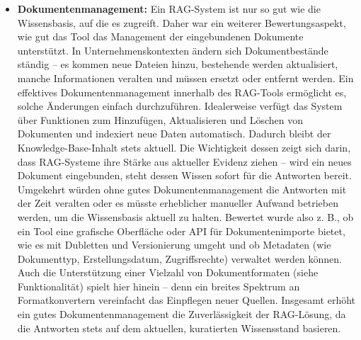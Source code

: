 \begin{itemize}
    \item \textbf{Dokumentenmanagement:} Ein RAG-System ist nur so gut wie die Wissensbasis, auf die es zugreift. Daher war ein weiterer Bewertungsaspekt, wie gut das Tool das Management der eingebundenen Dokumente unterstützt. In Unternehmenskontexten ändern sich Dokumentbestände ständig – es kommen neue Dateien hinzu, bestehende werden aktualisiert, manche Informationen veralten und müssen ersetzt oder entfernt werden. Ein effektives Dokumentenmanagement innerhalb des RAG-Tools ermöglicht es, solche Änderungen einfach durchzuführen. Idealerweise verfügt das System über Funktionen zum Hinzufügen, Aktualisieren und Löschen von Dokumenten und indexiert neue Daten automatisch. Dadurch bleibt der Knowledge-Base-Inhalt stets aktuell. Die Wichtigkeit dessen zeigt sich darin, dass RAG-Systeme ihre Stärke aus aktueller Evidenz ziehen – wird ein neues Dokument eingebunden, steht dessen Wissen sofort für die Antworten bereit. Umgekehrt würden ohne gutes Dokumentenmanagement die Antworten mit der Zeit veralten oder es müsste erheblicher manueller Aufwand betrieben werden, um die Wissensbasis aktuell zu halten. Bewertet wurde also z. B., ob ein Tool eine grafische Oberfläche oder API für Dokumentenimporte bietet, wie es mit Dubletten und Versionierung umgeht und ob Metadaten (wie Dokumenttyp, Erstellungsdatum, Zugriffsrechte) verwaltet werden können. Auch die Unterstützung einer Vielzahl von Dokumentformaten (siehe Funktionalität) spielt hier hinein – denn ein breites Spektrum an Formatkonvertern vereinfacht das Einpflegen neuer Quellen. Insgesamt erhöht ein gutes Dokumentenmanagement die Zuverlässigkeit der RAG-Lösung, da die Antworten stets auf dem aktuellen, kuratierten Wissensstand basieren.

\end{itemize}
